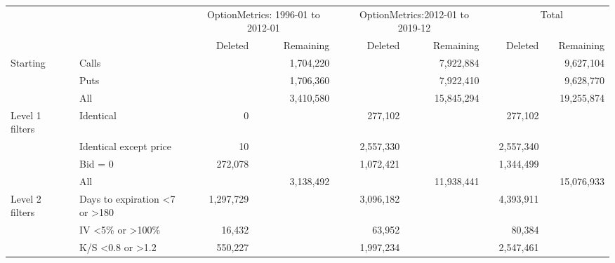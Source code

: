 

    \begin{tabular}{*{4}{l} *{11}{r} }
       
        
         \multicolumn{4}{c}{}  & \multicolumn{3}{c}{OptionMetrics: 1996-01 to 2012-01}  &  \multicolumn{1}{c}{} & 
         \multicolumn{3}{c}{OptionMetrics:2012-01 to 2019-12}&  \multicolumn{1}{c}{}  &
          \multicolumn{3}{c}{Total}  \\
         \cline{5-7}
                  
         \cline{9-11}
         \cline{13-15}
         
          &  & & & 
          Deleted &  & Remaining & &
          Deleted &  & Remaining & &
          Deleted &  & Remaining 
          \\

       \hline

	
				Starting & & Calls & &
				 & & 1,704,220 & &
				 & & 7,922,884 & &
				 & & 9,627,104 \\
			
				  & & Puts & &
				 & & 1,706,360 & &
				 & & 7,922,410 & &
				 & & 9,628,770 \\
			
				  & & All & &
				 & & 3,410,580 & &
				 & & 15,845,294 & &
				 & & 19,255,874 \\
			
				Level 1 filters & & Identical & &
				0 & &  & &
				277,102 & &  & &
				277,102 & &  \\
			
				  & & Identical except price & &
				10 & &  & &
				2,557,330 & &  & &
				2,557,340 & &  \\
			
				  & & Bid = 0 & &
				272,078 & &  & &
				1,072,421 & &  & &
				1,344,499 & &  \\
			
				  & & All & &
				 & & 3,138,492 & &
				 & & 11,938,441 & &
				 & & 15,076,933 \\
			
				Level 2 filters & & Days to expiration <7 or >180 & &
				1,297,729 & &  & &
				3,096,182 & &  & &
				4,393,911 & &  \\
			
				  & & IV <5\% or >100\% & &
				16,432 & &  & &
				63,952 & &  & &
				80,384 & &  \\
			
				  & & K/S <0.8 or >1.2 & &
				550,227 & &  & &
				1,997,234 & &  & &
				2,547,461 & &  \\
			

\end{tabular}
